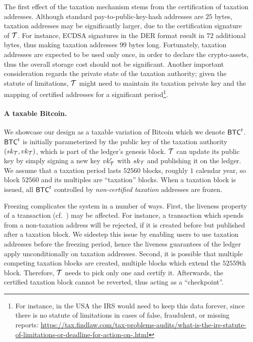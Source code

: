 The first effect of the taxation mechanism stems from the certification of
taxation addresses.  Although standard pay-to-public-key-hash addresses are
$25$ bytes, taxation addresses may be significantly larger, due to the
certification signature of $\taxAuth$. For instance, ECDSA signatures in the
DER format result in $72$ additional bytes, thus making taxation addresses $99$
bytes long. Fortunately, taxation addresses are expected to be used only once,
in order to declare the crypto-assets, thus the overall storage cost should not
be significant.  Another important consideration regards the private state of
the taxation authority; given the statute of limitations, $\taxAuth$ might need
to maintain its taxation private key and the mapping of certified addresses for
a significant period\footnote{For instance, in the USA the IRS would need to
keep this data forever, since there is no statute of limitations in cases of
false, fraudulent, or missing reports:
\url{https://tax.findlaw.com/tax-problems-audits/what-is-the-irs-statute-of-limitations-or-deadline-for-action-on-.html}}.

\paragraph{A taxable Bitcoin.}

We showcase our design as a taxable variation of Bitcoin which we denote
$\taxBtc$. $\taxBtc$ is initially parameterized by the public key of the
taxation authority $\keypair[\taxAuth]$, which is part of the ledger's genesis
block.  $\taxAuth$ can update its public key by simply signing a new key
$\verifykey_\taxAuth'$ with $\signkey_\taxAuth$ and publishing it on the
ledger.  We assume that a taxation period lasts $52560$ blocks, \ie roughly $1$
calendar year, so block $52560$ and its multiples are ``taxation'' blocks.
When a taxation block is issued, all $\taxBtc$ controlled by \emph{non-certified
taxation} addresses are frozen.

Freezing complicates the system in a number of ways. First, the liveness
property of a transaction (cf.~\cite{EC:GarKiaLeo15}) may be affected. For
instance, a transaction which spends from a non-taxation address will be
rejected, if it is created before but published after a taxation block. We
sidestep this issue by enabling users to use taxation addresses before the
freezing period, hence the liveness guarantees of the ledger apply
unconditionally on taxation addresses. Second, it is possible that multiple
competing taxation blocks are created, \eg multiple blocks which extend the
$52559$th block. Therefore, $\taxAuth$ needs to pick only one and certify it.
Afterwards, the certified taxation block cannot be reverted, thus acting as a
``checkpoint''.

